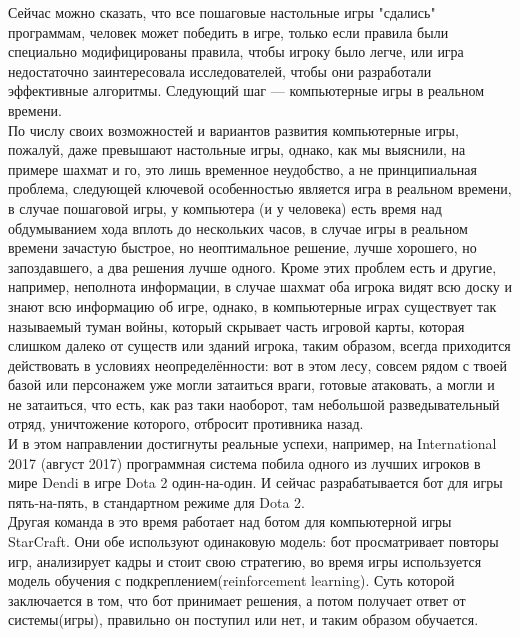 Сейчас можно сказать, что все пошаговые настольные игры "сдались" программам, человек может победить в игре, только если правила были специально модифицированы правила, чтобы игроку было легче, или игра недостаточно заинтересовала исследователей, чтобы они разработали эффективные алгоритмы. Следующий шаг --- компьютерные игры в реальном времени.\\

По числу своих возможностей и вариантов развития компьютерные игры, пожалуй, даже превышают настольные игры, однако, как мы выяснили, на примере шахмат и го, это лишь временное неудобство, а не принципиальная проблема, следующей ключевой особенностью является игра в реальном времени, в случае пошаговой игры, у компьютера (и у человека) есть время над обдумыванием хода вплоть до нескольких часов, в случае игры в реальном времени зачастую быстрое, но неоптимальное решение, лучше хорошего, но запоздавшего, а два решения лучше одного. Кроме этих проблем есть и другие, например, неполнота информации, в случае шахмат оба игрока видят всю доску и знают всю информацию об игре, однако, в компьютерные играх существует так называемый туман войны, который скрывает часть игровой карты, которая слишком далеко от существ или зданий игрока, таким образом, всегда приходится действовать в условиях неопределённости: вот в этом лесу, совсем рядом с твоей базой или персонажем уже могли затаиться враги, готовые атаковать, а могли и не затаиться, что есть, как раз таки наоборот, там небольшой разведывательный отряд, уничтожение которого, отбросит противника назад.\\

И в этом направлении достигнуты реальные успехи, например, на International 2017 (август 2017) программная система побила одного из лучших игроков в мире Dendi в игре Dota 2 один-на-один\cite{dota:ai_vs_dendi}. И сейчас разрабатывается бот для игры пять-на-пять, в стандартном режиме для Dota 2\cite{dota:ai_vs_5}.\\

Другая команда в это время работает над ботом для компьютерной игры StarCraft\cite{starcraft:bot_vs_human}\cite{starcraft:bot_vs_human2}. Они обе используют одинаковую модель: бот просматривает повторы игр, анализирует кадры и стоит свою стратегию, во время игры используется модель обучения с подкреплением(reinforcement learning). Суть которой заключается в том, что бот принимает решения, а потом получает ответ от системы(игры), правильно он поступил или нет, и таким образом обучается.\\\\


